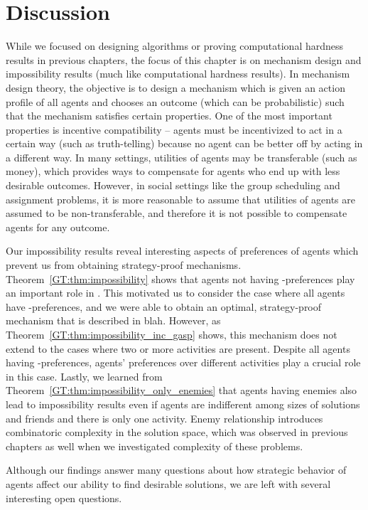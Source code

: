 \section{Discussion}

While we focused on designing algorithms or proving computational hardness results in previous chapters, the focus of this chapter is on mechanism design and impossibility results (much like computational hardness results). In mechanism design theory, the objective is to design a mechanism which is given an action profile of all agents and chooses an outcome (which can be probabilistic) such that the mechanism satisfies certain properties. One of the most important properties is incentive compatibility -- agents must be incentivized to act in a certain way (such as truth-telling) because no agent can be better off by acting in a different way. In many settings, utilities of agents may be transferable (such as money), which provides ways to compensate for agents who end up with less desirable outcomes. However, in social settings like the group scheduling and assignment problems, it is more reasonable to assume that utilities of agents are assumed to be non-transferable, and therefore it is not possible to compensate agents for any outcome. 

Our impossibility results reveal interesting aspects of preferences of agents which prevent us from obtaining strategy-proof mechanisms.  Theorem~\ref{GT:thm:impossibility} shows that agents not having \INC-preferences play an important role in \AOIP. This motivated us to consider the case where all agents have \INC-preferences, and we were able to obtain an optimal, strategy-proof mechanism that is described in blah.
However, as Theorem~\ref{GT:thm:impossibility_inc_gasp} shows, this mechanism does not extend to the cases where two or more activities are present. Despite all agents having \INC-preferences, agents' preferences over different activities play a crucial role in this case. Lastly, we learned from Theorem~\ref{GT:thm:impossibility_only_enemies} that agents having enemies also lead to impossibility results even if agents are indifferent among sizes of solutions and friends and there is only one activity. Enemy relationship introduces combinatoric complexity in the solution space, which was observed in previous chapters as well when we investigated complexity of these problems.

Although our findings answer many questions about how strategic behavior of agents affect our ability to find desirable solutions, we are left with several interesting open questions. 

